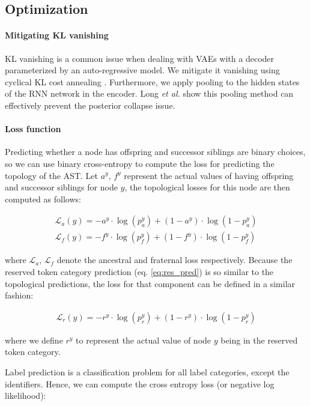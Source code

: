 \subsection{Optimization}

\paragraph{Mitigating KL vanishing}
KL vanishing is a common issue when dealing with VAEs with a decoder parameterized by an auto-regressive model.
We mitigate it vanishing using cyclical KL cost annealing \cite{fu2019cyclical}. Furthermore, we apply pooling to the hidden states of the RNN network in the encoder. Long \textit{et al.} \cite{long2019preventing} show this pooling method can effectively prevent the posterior collapse issue. 

\paragraph{Loss function}
Predicting whether a node has offspring and successor siblings are binary choices, so we can use binary cross-entropy to compute the loss for predicting the topology of the AST. 
Let $a^y$, $f^y$ represent the actual values of having offspring and successor siblings for node $y$, the topological losses for this node are then computed as follows:

\begin{align}
    \mathcal{L}_{a}(y) = - a^y \cdot \log(p^y_a) + (1 - a^y) \cdot \log(1 - p^y_a) \\
    \mathcal{L}_{f}(y) = - f^y \cdot \log(p^y_f) + (1 - f^y) \cdot \log(1 - p^y_f)
\end{align}

\noindent where $\mathcal{L}_{a}$, $\mathcal{L}_{f}$ denote the ancestral and fraternal loss respectively. Because the reserved token category prediction (eq. \ref{eq:res_pred}) is so similar to the topological predictions, the loss for that component can be defined in a similar fashion:

\begin{align}
    \mathcal{L}_{r}(y) = - r^y \cdot \log(p^y_r) + (1 - r^y) \cdot \log(1 - p^y_r)
\end{align}

\noindent where we define $r^y$ to represent the actual value of node $y$ being in the reserved token category. 



Label prediction is a classification problem for all label categories, except the identifiers.
Hence, we can compute the cross entropy loss (or negative log likelihood):

